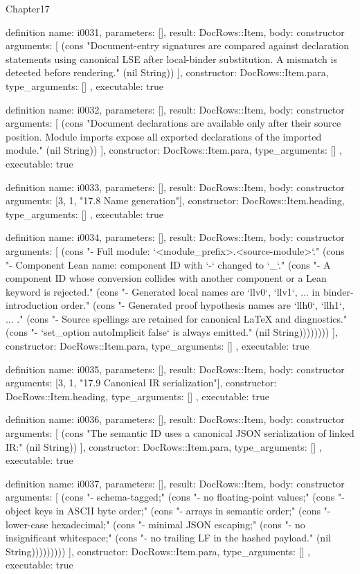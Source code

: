 \begin{lexlean}{Chapter17}
\begin{semanticmodule}
definition{
  name: i0031,
  parameters: [],
  result: DocRows::Item,
  body: constructor{
    arguments: [
      (cons "Document-entry signatures are compared against declaration statements using canonical LSE after local-binder substitution. A mismatch is detected before rendering." (nil String))
    ],
    constructor: DocRows::Item.para,
    type_arguments: []
  },
  executable: true
}

definition{
  name: i0032,
  parameters: [],
  result: DocRows::Item,
  body: constructor{
    arguments: [
      (cons "Document declarations are available only after their source position. Module imports expose all exported declarations of the imported module." (nil String))
    ],
    constructor: DocRows::Item.para,
    type_arguments: []
  },
  executable: true
}

definition{
  name: i0033,
  parameters: [],
  result: DocRows::Item,
  body: constructor{
    arguments: [3, 1, "17.8 Name generation"],
    constructor: DocRows::Item.heading,
    type_arguments: []
  },
  executable: true
}

definition{
  name: i0034,
  parameters: [],
  result: DocRows::Item,
  body: constructor{
    arguments: [
      (cons "- Full module: `<module_prefix>.<source-module>`." (cons "- Component Lean name: component ID with `-` changed to `_`." (cons "- A component ID whose conversion collides with another component or a Lean keyword is rejected." (cons "- Generated local names are `llv0`, `llv1`, ... in binder-introduction order." (cons "- Generated proof hypothesis names are `llh0`, `llh1`, ... ." (cons "- Source spellings are retained for canonical LaTeX and diagnostics." (cons "- `set_option autoImplicit false` is always emitted." (nil String))))))))
    ],
    constructor: DocRows::Item.para,
    type_arguments: []
  },
  executable: true
}

definition{
  name: i0035,
  parameters: [],
  result: DocRows::Item,
  body: constructor{
    arguments: [3, 1, "17.9 Canonical IR serialization"],
    constructor: DocRows::Item.heading,
    type_arguments: []
  },
  executable: true
}

definition{
  name: i0036,
  parameters: [],
  result: DocRows::Item,
  body: constructor{
    arguments: [
      (cons "The semantic ID uses a canonical JSON serialization of linked IR:" (nil String))
    ],
    constructor: DocRows::Item.para,
    type_arguments: []
  },
  executable: true
}

definition{
  name: i0037,
  parameters: [],
  result: DocRows::Item,
  body: constructor{
    arguments: [
      (cons "- schema-tagged;" (cons "- no floating-point values;" (cons "- object keys in ASCII byte order;" (cons "- arrays in semantic order;" (cons "- lower-case hexadecimal;" (cons "- minimal JSON escaping;" (cons "- no insignificant whitespace;" (cons "- no trailing LF in the hashed payload." (nil String)))))))))
    ],
    constructor: DocRows::Item.para,
    type_arguments: []
  },
  executable: true
}


\end{semanticmodule}
\end{lexlean}
